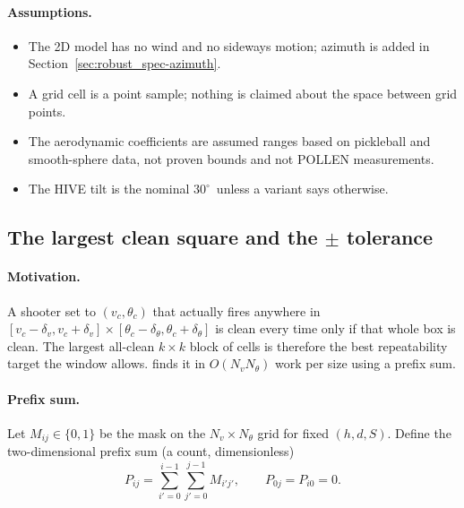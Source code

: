 \paragraph{Assumptions.}
\begin{itemize}
  \item The 2D model has no wind and no sideways motion; azimuth is added in
    Section~\ref{sec:robust_spec-azimuth}.
  \item A grid cell is a point sample; nothing is claimed about the space between grid points.
  \item The aerodynamic coefficients are assumed ranges based on pickleball and smooth-sphere data,
    not proven bounds and not POLLEN measurements.
  \item The HIVE tilt is the nominal $30^\circ$\confirmed\ unless a variant says otherwise.
\end{itemize}

\subsection{The largest clean square and the $\pm$ tolerance}
\label{sec:robust_spec-square}

\paragraph{Motivation.}
A shooter set to $(v_c,\theta_c)$ that actually fires anywhere in
$[v_c-\delta_v, v_c+\delta_v]\times[\theta_c-\delta_\theta,\theta_c+\delta_\theta]$ is clean every time
only if that whole box is clean.
The largest all-clean $k\times k$ block of cells is therefore the best repeatability target the
window allows.
 finds it in $O(N_v N_\theta)$ work per size using a prefix sum.

\paragraph{Prefix sum.}
Let $M_{ij}\in\{0,1\}$ be the mask on the $N_v\times N_\theta$ grid for fixed $(h,d,S)$.
Define the two-dimensional prefix sum (a count, dimensionless)
\begin{equation}
  P_{ij} = \sum_{i'=0}^{i-1}\sum_{j'=0}^{j-1} M_{i'j'},\qquad P_{0j}=P_{i0}=0 .
  \label{eq:robust_spec-prefix}
\end{equation}

